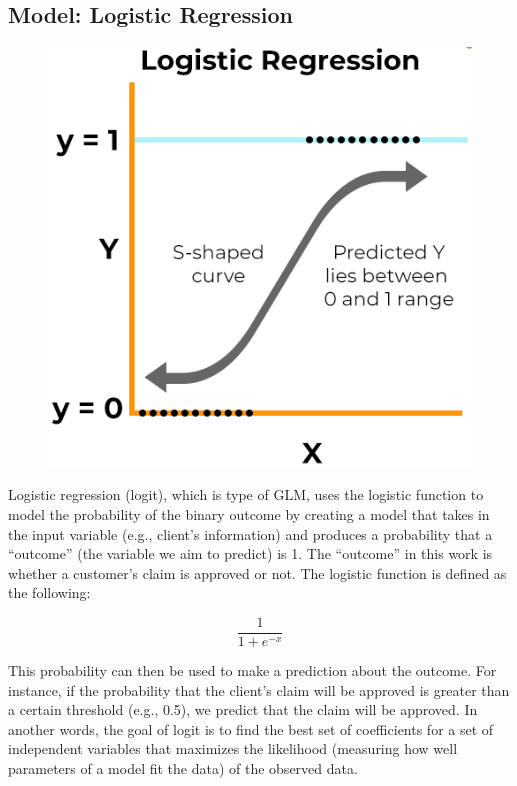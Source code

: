 \documentclass{article}
\begin{document}
\hypertarget{model-logistic-regression}{%
\subsection{\texorpdfstring{Model: Logistic Regression
\label{subsec:model-logit}}{Model: Logistic Regression }}\label{model-logistic-regression}}

\begin{figure}
\includegraphics[width=0.9\linewidth]{./figures/logit-model.png}
\end{figure}

Logistic regression (logit), which is type of GLM, uses the logistic
function to model the probability of the binary outcome by creating a
model that takes in the input variable (e.g., client's information) and
produces a probability that a ``outcome'' (the variable we aim to
predict) is 1. The ``outcome'' in this work is whether a customer's
claim is approved or not. The logistic function is defined as the
following:

\[\frac{1}{1 + e^{-x}}\]

This probability can then be used to make a prediction about the
outcome. For instance, if the probability that the client's claim will
be approved is greater than a certain threshold (e.g., 0.5), we predict
that the claim will be approved. In another words, the goal of logit is
to find the best set of coefficients for a set of independent variables
that maximizes the likelihood (measuring how well parameters of a model
fit the data) of the observed data.
\end{document}
